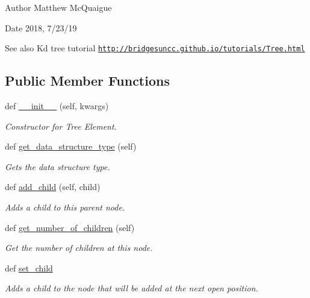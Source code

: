 \begin{DoxyAuthor}{Author}
Matthew Mc\+Quaigue
\end{DoxyAuthor}
\begin{DoxyDate}{Date}
2018, 7/23/19 
\end{DoxyDate}
\begin{DoxySeeAlso}{See also}
Kd tree tutorial \href{http://bridgesuncc.github.io/tutorials/Tree.html}{\tt http\+://bridgesuncc.\+github.\+io/tutorials/\+Tree.\+html} 
\end{DoxySeeAlso}
\subsection*{Public Member Functions}
\begin{DoxyCompactItemize}
\item 
def \hyperlink{classbridges_1_1tree__element_1_1_tree_element_a37f9f119e4a1c0ff01b30bbb2f505a97}{\+\_\+\+\_\+init\+\_\+\+\_\+} (self, kwargs)
\begin{DoxyCompactList}\small\item\em Constructor for Tree Element. \end{DoxyCompactList}\item 
def \hyperlink{classbridges_1_1tree__element_1_1_tree_element_aeefaf309c1271b2e7272cf63be496457}{get\+\_\+data\+\_\+structure\+\_\+type} (self)
\begin{DoxyCompactList}\small\item\em Gets the data structure type. \end{DoxyCompactList}\item 
def \hyperlink{classbridges_1_1tree__element_1_1_tree_element_a7a5933a3de19a896712389dda41a4452}{add\+\_\+child} (self, child)
\begin{DoxyCompactList}\small\item\em Adds a child to this parent node. \end{DoxyCompactList}\item 
def \hyperlink{classbridges_1_1tree__element_1_1_tree_element_a5d0c6335324d675a6c0329dad72fca4d}{get\+\_\+number\+\_\+of\+\_\+children} (self)
\begin{DoxyCompactList}\small\item\em Get the number of children at this node. \end{DoxyCompactList}\item 
def \hyperlink{classbridges_1_1tree__element_1_1_tree_element_adb855562b31567f39e41e312f87ab98b}{set\+\_\+child}
\begin{DoxyCompactList}\small\item\em Adds a child to the node that will be added at the next open position. \end{DoxyCompactList}\item 

\end{DoxyCompactItemize}
